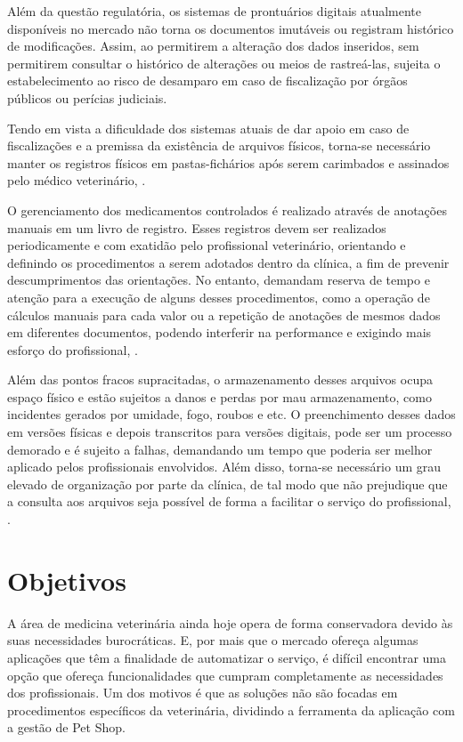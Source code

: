 \documentclass[
    12pt,               %
    openright,          %
    oneside,
    a4paper,            %
    BIBLATEX,           %
    TODO,               %
    english,            %
    brazil              %
    ]{ifsp-spo-inf-ctds}
\begin{document}
    Além da questão regulatória, os sistemas de prontuários digitais atualmente disponíveis no mercado não torna os documentos imutáveis ou registram histórico de modificações. Assim, ao permitirem a alteração dos dados inseridos, sem permitirem consultar o histórico de alterações ou meios de rastreá-las, sujeita o estabelecimento ao risco de desamparo em caso de fiscalização por órgãos públicos ou perícias judiciais.

    Tendo em vista a dificuldade dos sistemas atuais de dar apoio em caso de fiscalizações e a premissa da existência de arquivos físicos, torna-se necessário manter os registros físicos em pastas-fichários após serem carimbados e assinados pelo médico veterinário, .

    O gerenciamento dos medicamentos controlados é realizado através de anotações manuais em um livro de registro. Esses registros devem ser realizados periodicamente e com exatidão pelo profissional veterinário, orientando e definindo os procedimentos a serem adotados dentro da clínica, a fim de prevenir descumprimentos das orientações. No entanto, demandam reserva de tempo e atenção para a execução de alguns desses procedimentos, como a operação de cálculos manuais para cada valor ou a repetição de anotações de mesmos dados em diferentes documentos, podendo interferir na performance e exigindo mais esforço do profissional, .

    Além das pontos fracos supracitadas, o armazenamento desses arquivos ocupa espaço físico e estão sujeitos a danos e perdas por mau armazenamento, como incidentes gerados por umidade, fogo, roubos e etc. O preenchimento desses dados em versões físicas e depois transcritos para versões digitais, pode ser um processo demorado e é sujeito a falhas, demandando um tempo que poderia ser melhor aplicado pelos profissionais envolvidos. Além disso, torna-se necessário um grau elevado de organização por parte da clínica, de tal modo que não prejudique que a consulta aos arquivos seja possível de forma a facilitar o serviço do profissional, .

    \section{Objetivos} \label{objetivos}

    A área de medicina veterinária ainda hoje opera de forma conservadora devido às suas necessidades burocráticas. E, por mais que o mercado ofereça algumas aplicações que têm a finalidade de automatizar o serviço, é difícil encontrar uma opção que ofereça funcionalidades que cumpram completamente as necessidades dos profissionais. Um dos motivos é que as soluções não são focadas em procedimentos específicos da veterinária, dividindo a ferramenta da aplicação com a gestão de Pet Shop.
\end{document}
